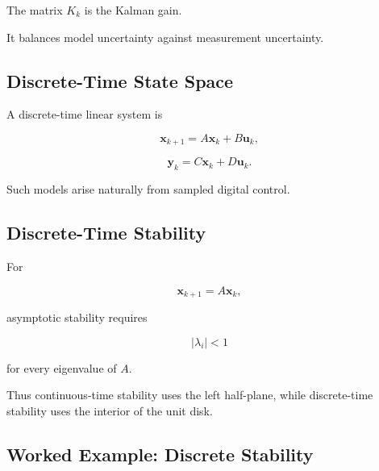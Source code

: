 The matrix \(K_k\) is the Kalman gain.

It balances model uncertainty against measurement uncertainty.

\subsection{Discrete-Time State Space}
\label{subsec:discrete-time-state-space}

A discrete-time linear system is

\[
\boxed{
\mathbf{x}_{k+1}
=
A\mathbf{x}_k
+
B\mathbf{u}_k,
}
\]

\[
\boxed{
\mathbf{y}_k
=
C\mathbf{x}_k
+
D\mathbf{u}_k.
}
\]

Such models arise naturally from sampled digital control.

\subsection{Discrete-Time Stability}
\label{subsec:discrete-time-stability-control}

For

\[
\mathbf{x}_{k+1}
=
A\mathbf{x}_k,
\]

asymptotic stability requires

\[
\boxed{
|\lambda_i|<1
}
\]

for every eigenvalue of \(A\).

Thus continuous-time stability uses the left half-plane, while discrete-time
stability uses the interior of the unit disk.

\subsection{Worked Example: Discrete Stability}
\label{subsec:worked-discrete-stability}

